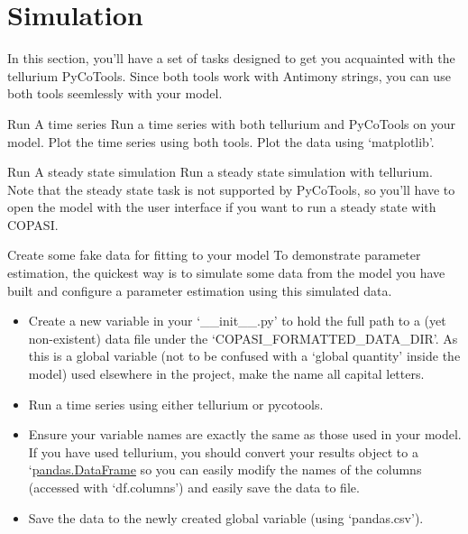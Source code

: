 \documentclass[../../main]{subfiles}
\begin{document}
\section{Simulation}
In this section, you'll have a set of tasks designed to get you acquainted with the tellurium
PyCoTools. Since both tools work with Antimony strings, you can use both tools seemlessly
with your model.

\begin{Task}[label=TimeSeries]{Run A time series}
Run a time series with both tellurium and PyCoTools on your model. Plot the time series using both tools.
    Plot the data using `matplotlib'.
\end{Task}

\begin{Task}[label=SteadyState]{Run A steady state simulation}
    Run a steady state simulation with tellurium. Note that the steady state task is not supported by PyCoTools, so you'll have to open the model with the user interface
    if you want to run a steady state with COPASI.
\end{Task}

\begin{Task}[label=CreateFakeData]{Create some fake data for fitting to your model}
    To demonstrate parameter estimation, the quickest way is to simulate some data from the
    model you have built and configure a parameter estimation using this simulated data.
    \begin{itemize}
        \item Create a new variable in your `\_\_init\_\_.py' to hold the full path to a
        (yet non-existent) data file under the `COPASI\_FORMATTED\_DATA\_DIR'.
        As this is a global variable (not to be confused with a `global quantity' inside the model)
        used elsewhere in the project, make the name all capital letters.
        \item Run a time series using either tellurium or pycotools.
        \item Ensure your variable names are exactly the same as those used in your model. If you have used
        tellurium, you should convert your results object to a
        `\href{https://pandas.pydata.org/pandas-docs/stable/reference/api/pandas.DataFrame.html}{pandas.DataFrame} so you can easily
        modify the names of the columns (accessed with `df.columns') and easily save the data to file.
        \item Save the data to the newly created global variable (using `pandas.csv').
    \end{itemize}
\end{Task}
\end{document}
